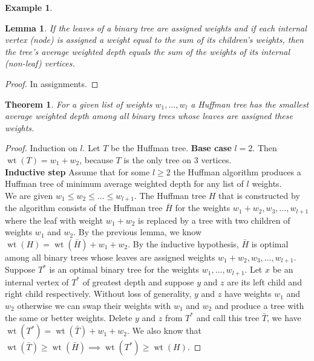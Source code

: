 \documentclass{article}
\newtheorem*{thm}{Theorem}
\newtheorem*{lem}{Lemma}
\theoremstyle{definition}
\newtheorem*{ex}{Example}
\DeclareMathOperator{\wt}{wt}
\begin{document}
\begin{ex}
\end{ex}

\begin{lem}
If the leaves of a binary tree are assigned weights and if each internal vertex (node) is assigned a weight equal to the sum of its children's weights, then the tree's average weighted depth equals the sum of the weights of its internal (non-leaf) vertices.
\end{lem}

\begin{proof}
In assignments.
\end{proof}

\begin{thm}
For a given list of weights $w_1,\ldots,w_l$ a Huffman tree has the smallest average weighted depth among all binary trees whose leaves are assigned these weights.
\end{thm}

\begin{proof}
Induction on $l$.
Let $T$ be the Huffman tree.
\textbf{Base case} $l=2$. Then $\wt(T) = w_1 + w_2$, because $T$ is the only tree on 3 vertices. \\
\textbf{Inductive step} Assume that for some $l\ge 2$ the Huffman algorithm produces a Huffman tree of minimum average weighted depth for any list of $l$ weights. \\
We are given $w_1\le w_2\le \ldots\le w_{l+1}$. The Huffman tree $H$ that is constructed by the algorithm consists of the Huffman tree $\bar{H}$ for the weights $w_1+w_2,w_3,\ldots,w_{l+1}$ where the leaf with weight $w_1+w_2$ is replaced by a tree with two children of weights $w_1$ and $w_2$.
By the previous lemma, we know $\wt(H) = \wt(\bar{H}) + w_1 + w_2$.
By the inductive hypothesis, $\bar{H}$ is optimal among all binary trees whose leaves are assigned weights  $w_1+w_2,w_3,\ldots,w_{l+1}$. \\
Suppose $T^*$ is an optimal binary tree for the weights $w_1,\ldots,w_{l+1}$.
Let $x$ be an internal vertex of $T^*$ of greatest depth and suppose $y$ and $z$ are its left child and right child respectively. Without loss of generality, $y$ and $z$ have weights $w_1$ and $w_2$ otherwise we can swap their weights with $w_1$ and $w_2$ and produce a tree with the same or better weights.
Delete $y$ and $z$ from $T^*$ and call this tree $\bar{T}$, we have $\wt(T^*) = \wt(\bar{T}) + w_1 + w_2$. We also know that $\wt(\bar{T}) \ge \wt(\bar{H})\implies \wt(T^*)\ge \wt(H)$.
\end{proof}
\end{document}
